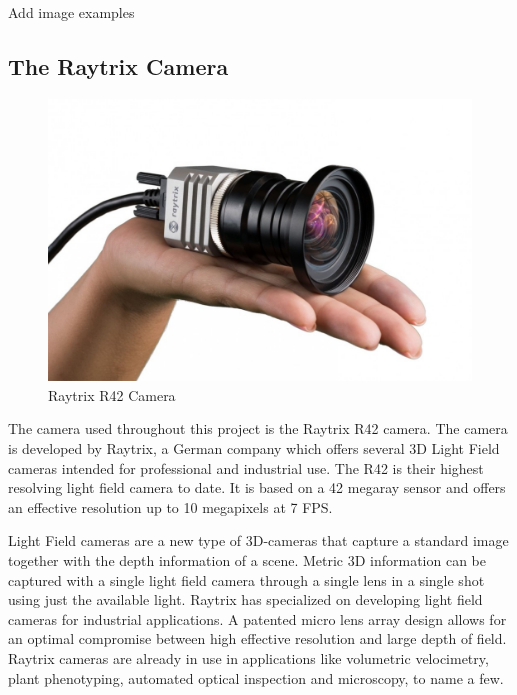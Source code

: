\cite{book:digital_image_processing}

{\color{red}Add image examples}



\subsection{The Raytrix Camera}

\begin{figure}[h]
    \centering
    \includegraphics[width=.9\linewidth]{images/introduction/raytrix_camera}
    \caption{Raytrix R42 Camera}
    \label{fig:raytrix_camera}
\end{figure}

The camera used throughout this project is the Raytrix R42 camera. The camera is developed by Raytrix, a German company which offers several 3D Light Field cameras intended for professional and industrial use. The R42 is their highest resolving light field camera to date. It is based on a 42 megaray sensor and offers an effective resolution up to 10 megapixels at 7 FPS. \cite{website:raytrix_r42}

Light Field cameras are a new type of 3D-cameras that capture a standard image together with the depth information of a scene. Metric 3D information can be captured with a single light field camera through a single lens in a single shot using just the available light. Raytrix has specialized on developing light field cameras for industrial applications. A patented micro lens array design allows for an optimal compromise between high effective resolution and large depth of field. Raytrix cameras are already in use in applications like volumetric velocimetry, plant phenotyping, automated optical inspection and microscopy, to name a few. \cite{website:raytrix_main}

